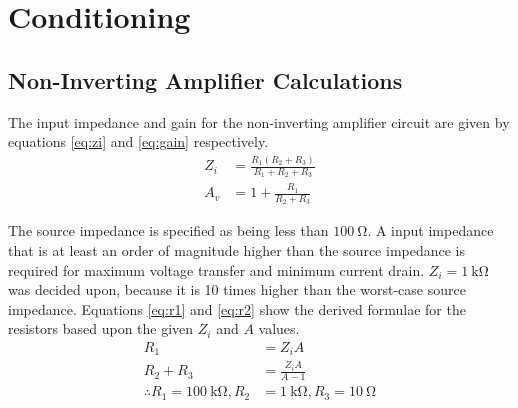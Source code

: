 \section{Conditioning}
\label{ap:conditioning}

\subsection{Non-Inverting Amplifier Calculations}
\label{ap:amplifier}

The input impedance and gain for the non-inverting amplifier circuit are given by equations \ref{eq:zi} and \ref{eq:gain} respectively.
\begin{align}
	Z_i &= \frac{R_1 (R_2 + R_3)}{R_1 + R_2 + R_3} \label{eq:zi} \\
	A_v &= 1 + \frac{R_1}{R_2 + R_3}\label{eq:gain}
\end{align}

The source impedance is specified as being less than $\SI{100}{\ohm}$.
A input impedance that is at least an order of magnitude higher than the source impedance is required for maximum voltage transfer and minimum current drain.
$Z_i = \SI{1}{\kilo\ohm}$ was decided upon, because it is 10 times higher than the worst-case source impedance.
Equations \ref{eq:r1} and \ref{eq:r2} show the derived formulae for the resistors based upon the given $Z_i$ and $A$ values.
\begin{align}
	R_1 &= Z_i A \label{eq:r1} \\
	R_2 + R_3 &= \frac{Z_i A}{A - 1} \label{eq:r2} \\[1em]
	\therefore R_1 = \SI{100}{\kilo\ohm}, R_2 &= \SI{1}{\kilo\ohm}, R_3 = \SI{10}{\ohm} \nonumber
\end{align}





